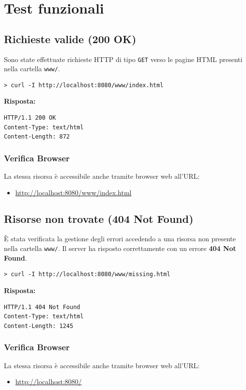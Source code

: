 \documentclass[a4paper,12pt]{report}
\begin{document}
\section{Test funzionali}
\subsection{Richieste valide (200 OK)}
Sono state effettuate richieste HTTP di tipo \texttt{GET} verso le pagine HTML presenti nella cartella \texttt{www/}.

\begin{verbatim}
> curl -I http://localhost:8080/www/index.html
\end{verbatim}

\textbf{Risposta:}
\begin{verbatim}
HTTP/1.1 200 OK
Content-Type: text/html
Content-Length: 872
\end{verbatim}

\subsubsection{Verifica Browser}
La stessa risorsa è accessibile anche tramite browser web all'URL:
\begin{itemize}
	\item \url{http://localhost:8080/www/index.html}
\end{itemize}

\newpage
\subsection{Risorse non trovate (404 Not Found)}
È stata verificata la gestione degli errori accedendo a una risorsa non presente nella cartella \texttt{www/}. Il server ha risposto correttamente con un errore \textbf{404 Not Found}.
\begin{verbatim}
> curl -I http://localhost:8080/www/missing.html
\end{verbatim}

\textbf{Risposta:}
\begin{verbatim}
HTTP/1.1 404 Not Found
Content-Type: text/html
Content-Length: 1245
\end{verbatim}

\subsubsection{Verifica Browser}
La stessa risorsa è accessibile anche tramite browser web all'URL:
\begin{itemize}
	\item \url{http://localhost:8080/}
\end{itemize}
\end{document}
